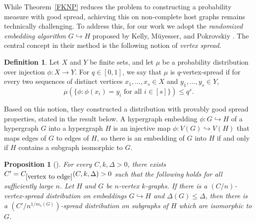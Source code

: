 \documentclass[11pt, letterpaper]{amsart}
\theoremstyle{plain}
\numberwithin{equation}{section}
\newtheorem{proposition}[thm]{Proposition}
\theoremstyle{definition}
\newtheorem{definition}[thm]{Definition}
\begin{document}
    While Theorem~\ref{FKNP} reduces the problem to constructing a probability measure with good spread, achieving this on non-complete host graphs remains technically challenging. To address this, for our work we adopt the \emph{randomized embedding algorithm} $G\hookrightarrow H$ proposed by Kelly, M\"{u}yesser, and Pokrovskiy \cite{kelly2024optimal}. The central concept in their method is the following notion of \emph{vertex spread}.

    \begin{definition}
        Let \(X\) and \(Y\) be finite sets, and let \(\mu\) be a probability distribution over injection \(\phi : X\rightarrow Y\). For \(q\in [0,1]\), we say that \(\mu\) is \(q\)-vertex-spread if for every two sequences of distinct vertices \(x_1,\dots, x_s\in X\) and \(y_1,\dots, y_s\in Y\), \[\mu \left(\{\phi: \phi(x_i)=y_i\text{ for all } i\in [s]\}\right)\le q^s.\]
    \end{definition}

    Based on this notion, they constructed a distribution with provably good spread properties, stated in the result below. 
    A hypergraph embedding \(\phi:G\hookrightarrow H\) of a hypergraph \(G\) into a hypergraph \(H\) is an injective map \(\phi:V(G)\hookrightarrow V(H)\) that maps edges of \(G\) to edges of \(H\), so there is an embedding of \(G\) into \(H\) if and only if \(H\) contains a subgraph isomorphic to \(G\). 

    \begin{proposition}[\cite{kelly2024optimal}]\label{vertex to edge}
        For every $C,k,\Delta>0$, there exists $C'=C_{\ref{vertex to edge}}(C,k,\Delta)>0$ such that the following holds for all sufficiently large $n$. Let $H$ and $G$ be $n$-vertex $k$-graphs. If there is a $(C/n)$-vertex-spread distribution on embeddings $G\hookrightarrow H$ and $\Delta(G)\le \Delta$, then there is a $(C'/n^{1/m_1(G)})$-spread distribution on subgraphs of $H$ which are isomorphic to $G$.
    \end{proposition}

    
\end{document}
